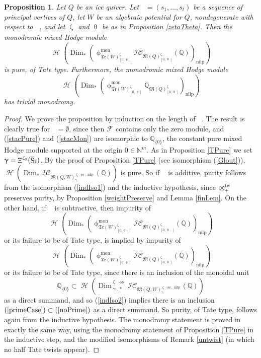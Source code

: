 \documentclass[a4paper,10pt]{amsart}
\newtheorem{proposition}[theorem]{Proposition}
\newcommand{\QQ}{\mathbb{Q}}
\DeclareMathOperator{\Simp}{S}
\newcommand{\WWW}{\mathfrak{Tr}(W)}
\newcommand{\Mst}{\mathfrak{M}}
\newcommand{\ICS}{\mathcal{IC}}
\newcommand{\phim}[1]{\phi^{\mon}_{#1}}
\newcommand{\shave}{\overline{\Simp}_{\Ss}}
\renewcommand{\theta}{\uptheta}
\renewcommand{\gamma}{\upgamma}
\renewcommand{\zeta}{\upzeta}
\renewcommand{\phi}{\upphi}
\DeclareMathOperator{\sst}{-ss}
\DeclareMathOperator{\nilp}{nilp}
\DeclareMathOperator{\Dim}{Dim}
\DeclareMathOperator{\tw}{tw}
\DeclareMathOperator{\mon}{mon}
\DeclareMathOperator{\Mu}{\Upxi}
\DeclareMathOperator{\Ss}{\overline{s}}
\DeclareMathOperator{\Ho}{\mathcal{H}}
\begin{document}
\begin{proposition}
\label{stackPure}
Let $Q$ be an ice quiver.  Let $\Ss=(s_1,\ldots,s_t)$ be a sequence of principal vertices of $Q$, let $W$ be an algebraic potential for $Q$, nondegenerate with respect to $\Ss$, and let $\zeta_{\Ss}$ and $\theta_{\Ss}$ be as in Proposition \ref{zetaTheta}.  Then the monodromic mixed Hodge module
\begin{equation}
\label{stacPure}
\Ho\left(\Dim_* \left(\phim{\WWW^{\zeta_{\Ss}}_{[0,\theta_{\Ss}]}}\ICS_{\Mst(Q)^{\zeta_{\Ss}}_{[0,\theta_{\Ss}]}}(\mathbb{Q})\right)_{\nilp}\right)
\end{equation}
is pure, of Tate type.  Furthermore, the monodromic mixed Hodge module
\begin{equation}
\label{stacMon}
\Ho\left(\Dim_* \left(\phim{\WWW^{\zeta_{\Ss}}_{[0,\theta_{\Ss}]}}\QQ_{\Mst(Q)^{\zeta_{\Ss}}_{[0,\theta_{\Ss}]}}\right)_{\nilp}\right)
\end{equation}
has trivial monodromy.
\end{proposition}
\begin{proof}
We prove the proposition by induction on the length of $\Ss$.  The result is clearly true for $\Ss=\emptyset$, since then $\mathcal{F}_{\Ss}$ contains only the zero module, and (\ref{stacPure}) and (\ref{stacMon}) are isomorphic to $\mathbb{Q}_{\{0\}}$, the constant pure mixed Hodge module supported at the origin $0\in\mathbb{N}^m$.  As in Proposition \ref{TPure} we set $\gamma=\Mu^{\zeta_{\Ss}}(\shave)$.  By the proof of Proposition \ref{TPure} (see isomorphism (\ref{Glout})), $\Ho\left(\Dim_*\ICS_{\Mst(Q,W)_{\gamma}^{\zeta_{\Ss}\sst,\nilp}}(\mathbb{Q})\right)$ is pure.  So if $\Ss$ is additive, purity follows from the isomorphism (\ref{indIso1}) and the inductive hypothesis, since $\boxtimes_{+}^{\tw}$ preserves purity, by Proposition \ref{weightPreserve} and Lemma \ref{finLem}.  On the other hand, if $\Ss$ is subtractive, then impurity of 
\begin{equation}
\label{noPrime}
\Ho\left(\Dim_* \left(\phim{\WWW^{\zeta_{\Ss'}}_{[0, \theta_{\Ss'}]}}\ICS_{\Mst(Q)^{\zeta_{\Ss'}}_{[0,\theta_{\Ss'}]}}(\mathbb{Q})\right)_{\nilp}\right)
\end{equation}
or its failure to be of Tate type, is implied by impurity of
\begin{equation}
\label{primeCase}
\Ho\left(\Dim_* \left(\phim{\WWW^{\zeta_{\Ss}}_{[0, \theta_{\Ss}]}}\ICS_{\Mst(Q)^{\zeta_{\Ss}}_{[0,\theta_{\Ss}]}}(\mathbb{Q})\right)_{\nilp}\right)
\end{equation}
or its failure to be of Tate type, since there is an inclusion of the monoidal unit 
\[
\mathbb{Q}_{\{0\}}\subset \Ho\left(\Dim_{\gamma,*}^{\zeta_{\Ss}\sst}\ICS_{\Mst(Q,W)_{\gamma}^{\zeta_{\Ss}\sst,\nilp}}(\mathbb{Q})\right)
\]
as a direct summand, and so (\ref{indIso2}) implies there is an inclusion $(\ref{primeCase})\subset(\ref{noPrime})$ as a direct summand.  So purity, of Tate type, follows again from the inductive hypothesis.  The monodromy statement is proved in exactly the same way, using the monodromy statement of Proposition \ref{TPure} in the inductive step, and the modified isomorphisms of Remark \ref{untwist} (in which no half Tate twists appear).
\end{proof}
\end{document}
